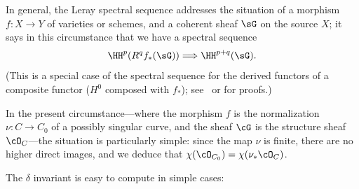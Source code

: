 In general, the Leray spectral sequence addresses the situation of  a morphism $f:X\to Y$ of varieties or schemes, 
 and a coherent sheaf $\sG$  on the source $X$; it says in this circumstance that we have a spectral sequence
  $$
  \HH^p(R^qf_*(\sG)) \Longrightarrow \HH^{p+q}(\sG).
  $$
(This is a special case of the spectral sequence for the derived functors of a composite functor ($H^0$ composed with $f_*$);
see~\cite[II.4.17.1]{Godement} or \cite[Section III.7]{Gelfand-Manin} for proofs.)

In the present circumstance---where the morphism $f$ is the normalization $\nu : C \to C_0$ of a possibly singular curve, and the sheaf $\cG$ is the structure sheaf $\cO_C$---the situation is particularly simple: since the map $\nu$ is finite, there are no higher direct images, and we deduce that $\chi(\cO_{C_0}) = \chi(\nu_*\cO_C)$.


The $\delta$ invariant is easy to compute in simple cases:


